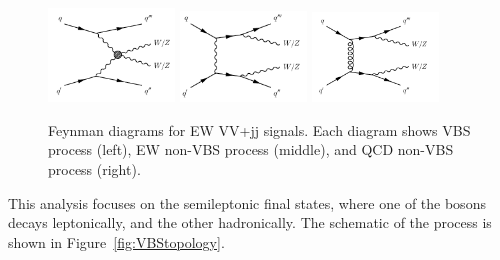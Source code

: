 \begin{figure}[H]
\begin{center}
 \includegraphics[width=0.3\textwidth,keepaspectratio]{figures/EWVVjj_a.png}
 \includegraphics[width=0.3\textwidth,keepaspectratio]{figures/EWVVjj_b.png}
 \includegraphics[width=0.3\textwidth,keepaspectratio]{figures/EWVVjj_c.png}

\caption[f]{
Feynman diagrams for EW VV+jj signals. Each diagram shows VBS process (left), EW non-VBS process (middle), and QCD non-VBS process (right).
}
\label{fig:feynmanEWVVjj}
\end{center}
\end{figure}



This analysis focuses on the semileptonic final states, where one of the bosons decays leptonically, and the other hadronically. 
The schematic of the process is shown in Figure~\ref{fig:VBStopology}.


